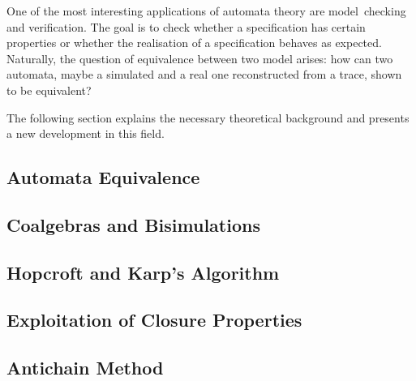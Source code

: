     One of the most interesting applications of automata theory are model~checking and verification.
    The goal is to check whether a specification has certain properties
    or whether the realisation of a specification behaves as expected.
    Naturally, the question of equivalence between two model arises:
    how can two automata, maybe a simulated and a real one reconstructed from a trace,
    shown to be equivalent?

    The following section explains the necessary theoretical background and presents a
    new development in this field.

    \subsection{Automata Equivalence}
    

    \subsection{Coalgebras and Bisimulations}
    

    \subsection{Hopcroft and Karp's Algorithm}
    

    \subsection{Exploitation of Closure Properties}
    

    \subsection{Antichain Method}
